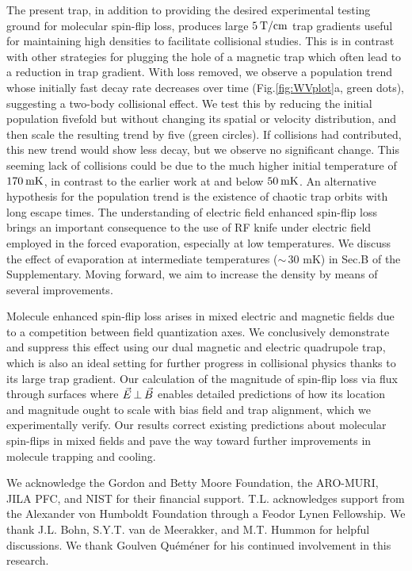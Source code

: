 \documentclass[%
 reprint,
 amsmath,amssymb,
 aps,
prl,
]{revtex4-1}
\newcommand{\epb}{{$\vec{E}\s {\perp}\s\vec{B}$}}
\newcommand{\s}{{\nobreak\hspace{.2em}}}
\begin{document}
The present trap, in addition to providing the desired experimental testing ground for molecular spin-flip loss, produces large $5\s\text{T/cm}$ trap gradients useful for maintaining high densities to facilitate collisional studies.
This is in contrast with other strategies for plugging the hole of a magnetic trap which often lead to a reduction in trap gradient.
With loss removed, we observe a population trend whose initially fast decay rate decreases over time (Fig.\s\ref{fig:WVplot}a, green dots), suggesting a two-body collisional effect.
We test this by reducing the initial population fivefold but without changing its spatial or velocity distribution\s\cite{ssm}, and then scale the resulting trend by five (green circles).
If collisions had contributed, this new trend would show less decay, but we observe no significant change.
This seeming lack of collisions could be due to the much higher initial temperature of $170\s\text{mK}$, in contrast to the earlier work at and below $50\s\text{mK}$\s\cite{Stuhl2012evap}. An alternative hypothesis for the population trend is the existence of chaotic trap orbits with long escape times\s\cite{Gonzalez-Ferez2014}.  The understanding of electric field enhanced spin-flip loss brings an important consequence to the use of RF knife under electric field employed in the forced evaporation, especially at low temperatures. We discuss the effect of evaporation at intermediate temperatures (${\sim}\,30\text{ mK}$) in Sec.\s B of the Supplementary\s\cite{ssm}.  Moving forward, we aim to increase the density by means of several improvements\s\cite{Even2015,Segev2017}.

Molecule enhanced spin-flip loss arises in mixed electric and magnetic fields due to a competition between field quantization axes.
We conclusively demonstrate and suppress this effect using our dual magnetic and electric quadrupole trap, which is also an ideal setting for further progress in collisional physics thanks to its large trap gradient.
Our calculation of the magnitude of spin-flip loss via flux through surfaces where \epb{} enables detailed predictions of how its location and magnitude ought to scale with bias field and trap alignment, which we experimentally verify.
Our results correct existing predictions about molecular spin-flips in mixed fields and pave the way toward further improvements in molecule trapping and cooling.

\begin{acknowledgments}
We acknowledge the Gordon and Betty Moore Foundation, the ARO-MURI, JILA PFC, and NIST for their financial support.
T.L. acknowledges support from the Alexander von Humboldt Foundation through a Feodor Lynen Fellowship.
We thank J.L. Bohn, S.Y.T. van de Meerakker, and M.T. Hummon for helpful discussions.
We thank Goulven Qu\'em\'ener for his continued involvement in this research.
\end{acknowledgments}



\end{document}
